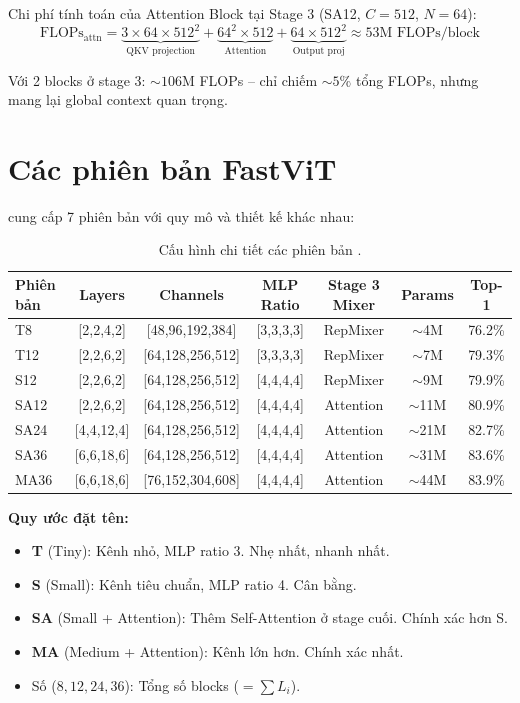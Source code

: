 Chi phí tính toán của Attention Block tại Stage 3 (SA12, $C = 512$, $N = 64$):
\begin{equation}
    \text{FLOPs}_{\text{attn}} = \underbrace{3 \times 64 \times 512^2}_{\text{QKV projection}} + \underbrace{64^2 \times 512}_{\text{Attention}} + \underbrace{64 \times 512^2}_{\text{Output proj}} \approx 53\text{M FLOPs/block}
\end{equation}

Với 2 blocks ở stage 3: $\sim 106$M FLOPs -- chỉ chiếm $\sim 5\%$ tổng FLOPs, nhưng mang lại global context quan trọng.

\section{Các phiên bản FastViT}
\label{sec:variants}

\fastvit{} cung cấp 7 phiên bản với quy mô và thiết kế khác nhau:

\begin{table}[H]
\centering
\caption{Cấu hình chi tiết các phiên bản \fastvit{}.}
\label{tab:variants}
\small
\begin{tabular}{l c c c c c c}
\toprule
\textbf{Phiên bản} & \textbf{Layers} & \textbf{Channels} & \textbf{MLP Ratio} & \textbf{Stage 3 Mixer} & \textbf{Params} & \textbf{Top-1} \\
\midrule
T8 & [2,2,4,2] & [48,96,192,384] & [3,3,3,3] & RepMixer & $\sim$4M & 76.2\% \\
T12 & [2,2,6,2] & [64,128,256,512] & [3,3,3,3] & RepMixer & $\sim$7M & 79.3\% \\
S12 & [2,2,6,2] & [64,128,256,512] & [4,4,4,4] & RepMixer & $\sim$9M & 79.9\% \\
SA12 & [2,2,6,2] & [64,128,256,512] & [4,4,4,4] & Attention & $\sim$11M & 80.9\% \\
SA24 & [4,4,12,4] & [64,128,256,512] & [4,4,4,4] & Attention & $\sim$21M & 82.7\% \\
SA36 & [6,6,18,6] & [64,128,256,512] & [4,4,4,4] & Attention & $\sim$31M & 83.6\% \\
MA36 & [6,6,18,6] & [76,152,304,608] & [4,4,4,4] & Attention & $\sim$44M & 83.9\% \\
\bottomrule
\end{tabular}
\end{table}

\textbf{Quy ước đặt tên:}
\begin{itemize}
    \item \textbf{T} (Tiny): Kênh nhỏ, MLP ratio 3. Nhẹ nhất, nhanh nhất.
    \item \textbf{S} (Small): Kênh tiêu chuẩn, MLP ratio 4. Cân bằng.
    \item \textbf{SA} (Small + Attention): Thêm Self-Attention ở stage cuối. Chính xác hơn S.
    \item \textbf{MA} (Medium + Attention): Kênh lớn hơn. Chính xác nhất.
    \item Số ($8, 12, 24, 36$): Tổng số blocks ($= \sum L_i$).
\end{itemize}

